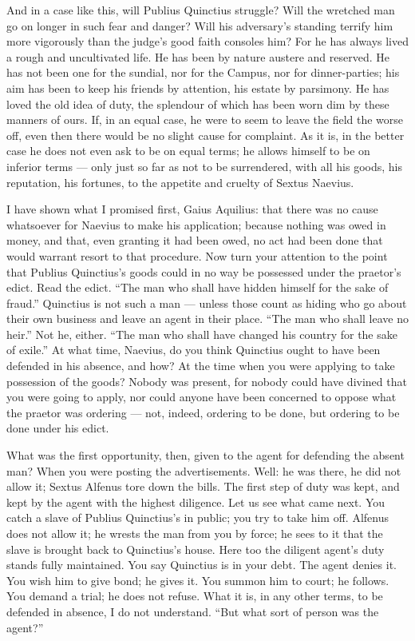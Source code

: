  And in a case like this, will Publius Quinctius struggle? Will the wretched man go on longer in such fear and danger? Will his adversary's standing terrify him more vigorously than the judge's good faith consoles him? For he has always lived a rough and uncultivated life. He has been by nature austere and reserved. He has not been one for the sundial, nor for the Campus, nor for dinner-parties; his aim has been to keep his friends by attention, his estate by parsimony. He has loved the old idea of duty, the splendour of which has been worn dim by these manners of ours. If, in an equal case, he were to seem to leave the field the worse off, even then there would be no slight cause for complaint. As it is, in the better case he does not even ask to be on equal terms; he allows himself to be on inferior terms --- only just so far as not to be surrendered, with all his goods, his reputation, his fortunes, to the appetite and cruelty of Sextus Naevius.

 I have shown what I promised first, Gaius Aquilius: that there was no cause whatsoever for Naevius to make his application; because nothing was owed in money, and that, even granting it had been owed, no act had been done that would warrant resort to that procedure. Now turn your attention to the point that Publius Quinctius's goods could in no way be possessed under the praetor's edict. Read the edict. ``The man who shall have hidden himself for the sake of fraud.'' Quinctius is not such a man --- unless those count as hiding who go about their own business and leave an agent in their place. ``The man who shall leave no heir.'' Not he, either. ``The man who shall have changed his country for the sake of exile.'' At what time, Naevius, do you think Quinctius ought to have been defended in his absence, and how? At the time when you were applying to take possession of the goods? Nobody was present, for nobody could have divined that you were going to apply, nor could anyone have been concerned to oppose what the praetor was ordering --- not, indeed, ordering to be done, but ordering to be done under his edict.

 What was the first opportunity, then, given to the agent for defending the absent man? When you were posting the advertisements. Well: he was there, he did not allow it; Sextus Alfenus tore down the bills. The first step of duty was kept, and kept by the agent with the highest diligence. Let us see what came next. You catch a slave of Publius Quinctius's in public; you try to take him off. Alfenus does not allow it; he wrests the man from you by force; he sees to it that the slave is brought back to Quinctius's house. Here too the diligent agent's duty stands fully maintained. You say Quinctius is in your debt. The agent denies it. You wish him to give bond; he gives it. You summon him to court; he follows. You demand a trial; he does not refuse. What it is, in any other terms, to be defended in absence, I do not understand. ``But what sort of person was the agent?''

